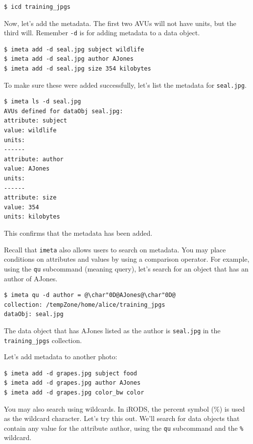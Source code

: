 \documentclass[10pt,oneside]{memoir}
\begin{document}
\begin{lstlisting}
$ icd training_jpgs
\end{lstlisting}

Now, let's add the metadata. The first two AVUs will not have units, but the third will. Remember \texttt{-d} is for adding metadata to a data object.

\begin{lstlisting}
$ imeta add -d seal.jpg subject wildlife
$ imeta add -d seal.jpg author AJones
$ imeta add -d seal.jpg size 354 kilobytes
\end{lstlisting}

To make sure these were added successfully, let's list the metadata for \texttt{seal.jpg}.

\begin{lstlisting}
$ imeta ls -d seal.jpg
AVUs defined for dataObj seal.jpg:
attribute: subject
value: wildlife
units:
------
attribute: author
value: AJones
units:
------
attribute: size
value: 354
units: kilobytes
\end{lstlisting}

This confirms that the metadata has been added.

Recall that \texttt{imeta} also allows users to search on metadata. You may place conditions on attributes and values by using a comparison operator. For example, using the \texttt{qu} subcommand (meaning query), let's search for an object that has an author of AJones.

\begin{lstlisting}
$ imeta qu -d author = @\char"0D@AJones@\char"0D@
collection: /tempZone/home/alice/training_jpgs
dataObj: seal.jpg
\end{lstlisting}

The data object that has AJones listed as the author is \texttt{seal.jpg} in the \texttt{training\_jpgs} collection.

Let's add metadata to another photo:

\begin{lstlisting}
$ imeta add -d grapes.jpg subject food
$ imeta add -d grapes.jpg author AJones
$ imeta add -d grapes.jpg color_bw color
\end{lstlisting}

You may also search using wildcards. In iRODS, the percent symbol (\%) is used as the wildcard character. Let's try this out. We'll search for data objects that contain any value for the attribute author, using the \texttt{qu} subcommand and the \texttt{\%} wildcard.
\end{document}
